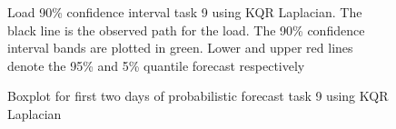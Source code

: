 \begin{figure}[!ht]
    \centering
    \caption[Prediction load track task 9, Laplacian kernel]{Load 90\% confidence interval task 9 using KQR Laplacian. The black line is the observed path for the load. The 90\% confidence interval bands are plotted in green. Lower and upper red lines denote the 95\% and 5\% quantile forecast respectively}
    \label{fig:load_task_9}
\end{figure}


\begin{figure}[!ht]
    \centering
    \caption{Boxplot for first two days of probabilistic forecast task 9 using KQR Laplacian}
    \label{fig:load_task_9}
\end{figure}




